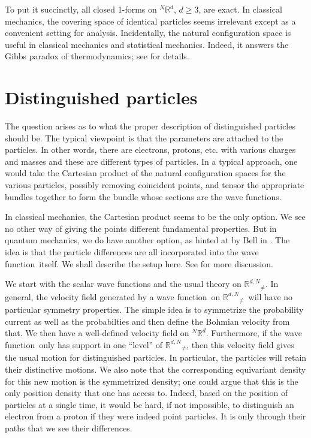 \documentclass[11pt]{article}
\theoremstyle{remark}
\begin{document}
To put it succinctly, all closed 1-forms on \ensuremath{{}^N\ensuremath{\mathbb{R}^{\ensuremath{d}}}}, $d \geq 3$, are
exact. In classical mechanics, the covering space of identical
particles seems irrelevant except as a convenient setting for analysis.
Incidentally, the natural configuration space is useful in classical
mechanics and statistical mechanics. 
Indeed, it answers the Gibbs paradox of thermodynamics; see
\cite{LM77} for details.

\section{Distinguished particles} \label{s:dpart}

The question arises as to what the proper description of distinguished
particles should be. The typical viewpoint is that the parameters are
attached to the particles. In other words, there are electrons,
protons, etc. with various charges and masses 
and these are different types of particles. 
In a typical approach, one would take the Cartesian product of 
 the natural configuration spaces for the various particles, 
possibly removing coincident
points, and tensor the appropriate bundles together to form the bundle
whose sections are the wave functions. 

In classical mechanics, the Cartesian product seems to be the only
option. We see no other way of giving the points different fundamental
properties. But in  
quantum mechanics, we do have another
option, as hinted at by Bell in \cite{Bell87}. The idea is that the particle
differences are all incorporated into the wave function\ itself. We shall
describe the setup here. See \cite{GTuTaZ03} for more discussion. 

We start with the scalar wave functions and the usual theory on \ensuremath{\ensuremath{\mathbb{R}^{d,N}}_{\neq}}. In
general, the velocity field generated by a wave function\ on \ensuremath{\ensuremath{\mathbb{R}^{d,N}}_{\neq}}\ will have no
particular symmetry properties. The simple idea is to symmetrize the
probability current as well as the probabilties and then define the
Bohmian velocity from that. We then have a well-defined velocity field on 
\ensuremath{{}^N\ensuremath{\mathbb{R}^{\ensuremath{d}}}}. Furthermore, if the wave function\ only has support in one ``level'' of
\ensuremath{\ensuremath{\mathbb{R}^{d,N}}_{\neq}}, then this velocity field gives the usual motion for
distinguished particles.  
In particular, the particles will retain their distinctive
motions. We also note that the corresponding equivariant density for
this new motion is the symmetrized density; one could argue that this is
the only position density that one has access to. Indeed, based on the
position of particles at a single time, it would be hard, if not
impossible, to distinguish an electron from a proton if they were
indeed point particles. It is only
through their paths that we see their differences. 
\end{document}
